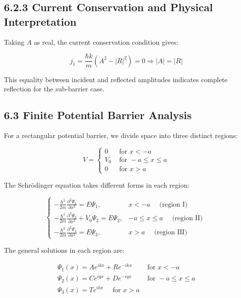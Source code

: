 \documentclass[italian]{HKNdocument}
\begin{document}
\subsection*{6.2.3 Current Conservation and Physical Interpretation}

Taking $A$ as real, the current conservation condition gives:

\begin{equation*}
j_{1}=\frac{\hbar k}{m}\left(A^{2}-|R|^{2}\right)=0 \Longrightarrow|A|=|R| \tag{6.49}
\end{equation*}

This equality between incident and reflected amplitudes indicates complete reflection for the sub-barrier case.

\subsection*{6.3 Finite Potential Barrier Analysis}

For a rectangular potential barrier, we divide space into three distinct regions:

\[
V= \begin{cases}0 & \text { for } x<-a  \tag{6.50}\\ V_{0} & \text { for }-a \leq x \leq a \\ 0 & \text { for } x>a\end{cases}
\]

The Schrödinger equation takes different forms in each region:

\[
\begin{cases}-\frac{\hbar^{2}}{2 m} \frac{\partial^{2} \Psi_{1}}{\partial x^{2}}=E \Psi_{1}, & x<-a \quad \text { (region I) }  \tag{6.51}\\ -\frac{\hbar^{2}}{2 m} \frac{\partial^{2} \Psi_{2}}{\partial x^{2}}+V_{0} \Psi_{2}=E \Psi_{2}, & -a \leq x \leq a \quad \text { (region II) } \\ -\frac{\hbar^{2}}{2 m} \frac{\partial^{2} \Psi_{3}}{\partial x^{2}}=E \Psi_{3}, & x>a \quad \text { (region III) }\end{cases}
\]

The general solutions in each region are:

\[
\begin{array}{ll}
\Psi_{1}(x)=A e^{i k x}+R e^{-i k x} & \text { for } x<-a \\
\Psi_{2}(x)=C e^{i q x}+D e^{-i q x} & \text { for }-a \leq x \leq a  \tag{6.52}\\
\Psi_{3}(x)=T e^{i k x} \quad \text { for } x>a &
\end{array}
\]
\end{document}
